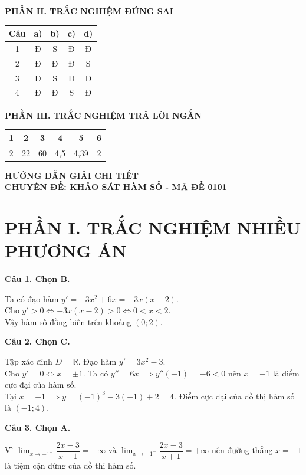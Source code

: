 \documentclass[12pt,a4paper]{article}
\newcommand{\loigiai}[1]{\par\medskip\Needspace{4\baselineskip}\noindent\textbf{#1}\par\nobreak}
\begin{document}
\textbf{PHẦN II. TRẮC NGHIỆM ĐÚNG SAI}
\begin{center}\renewcommand{\arraystretch}{1.5}\begin{tabular}{|c|c|c|c|c|}\hline
Câu & a) & b) & c) & d)\\\hline
1 & Đ & S & Đ & Đ\\\hline
2 & Đ & Đ & Đ & S\\\hline
3 & Đ & S & Đ & Đ\\\hline
4 & Đ & Đ & S & Đ\\\hline
\end{tabular}\end{center}

\textbf{PHẦN III. TRẮC NGHIỆM TRẢ LỜI NGẮN}
\begin{center}\renewcommand{\arraystretch}{1.5}\begin{tabular}{|c|c|c|c|c|c|}\hline
1 & 2 & 3 & 4 & 5 & 6\\\hline
2 & 22 & 60 & 4,5 & 4,39 & 2\\\hline
\end{tabular}\end{center}

\newpage
\begin{center}{\Large\textbf{HƯỚNG DẪN GIẢI CHI TIẾT}}\\[4pt]
\textbf{CHUYÊN ĐỀ: KHẢO SÁT HÀM SỐ - MÃ ĐỀ 0101}\end{center}

\section*{\large PHẦN I. TRẮC NGHIỆM NHIỀU PHƯƠNG ÁN}
\loigiai{Câu 1. Chọn B.}
Ta có đạo hàm $y' = -3x^2 + 6x = -3x(x - 2)$.\\
Cho $y' > 0 \iff -3x(x - 2) > 0 \iff 0 < x < 2$.\\
Vậy hàm số đồng biến trên khoảng $(0; 2)$.

\loigiai{Câu 2. Chọn C.}
Tập xác định $D = \mathbb{R}$. Đạo hàm $y' = 3x^2 - 3$.\\
Cho $y' = 0 \iff x = \pm 1$. Ta có $y'' = 6x \implies y''(-1) = -6 < 0$ nên $x = -1$ là điểm cực đại của hàm số.\\
Tại $x = -1 \implies y = (-1)^3 - 3(-1) + 2 = 4$. Điểm cực đại của đồ thị hàm số là $(-1; 4)$.

\loigiai{Câu 3. Chọn A.}
Vì $\displaystyle\lim_{x \to -1^+} \dfrac{2x - 3}{x + 1} = -\infty$ và $\displaystyle\lim_{x \to -1^-} \dfrac{2x - 3}{x + 1} = +\infty$ nên đường thẳng $x = -1$ là tiệm cận đứng của đồ thị hàm số.
\end{document}
